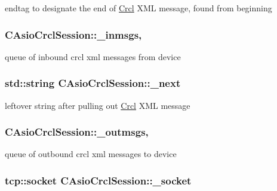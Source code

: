 endtag to designate the end of \hyperlink{namespaceCrcl}{Crcl} X\-M\-L message, found from beginning \hypertarget{classCAsioCrclSession_a35d708bc55a91795905e27ee3c69c3ec}{
\subsubsection[{\-\_\-inmsgs}]{ C\-Asio\-Crcl\-Session\-::\-\_\-inmsgs\hspace{0.3cm}{\ttfamily [static]}, {\ttfamily [protected]}}}\label{classCAsioCrclSession_a35d708bc55a91795905e27ee3c69c3ec}
queue of inbound crcl xml messages from device \hypertarget{classCAsioCrclSession_a332547f983c0b36b09933d9255dac802}{
\subsubsection[{\-\_\-next}]{\setlength{\rightskip}{0pt plus 5cm}std\-::string C\-Asio\-Crcl\-Session\-::\-\_\-next\hspace{0.3cm}{\ttfamily [protected]}}}\label{classCAsioCrclSession_a332547f983c0b36b09933d9255dac802}
leftover string after pulling out \hyperlink{namespaceCrcl}{Crcl} X\-M\-L message \hypertarget{classCAsioCrclSession_a450b2bbbfaf1376f80e68fe3d43507fc}{
\subsubsection[{\-\_\-outmsgs}]{ C\-Asio\-Crcl\-Session\-::\-\_\-outmsgs\hspace{0.3cm}{\ttfamily [static]}, {\ttfamily [protected]}}}\label{classCAsioCrclSession_a450b2bbbfaf1376f80e68fe3d43507fc}
queue of outbound crcl xml messages to device \hypertarget{classCAsioCrclSession_ab92574f487782a95cb9eb745fd1de536}{
\subsubsection[{\-\_\-socket}]{\setlength{\rightskip}{0pt plus 5cm}tcp\-::socket C\-Asio\-Crcl\-Session\-::\-\_\-socket\hspace{0.3cm}{\ttfamily [protected]}}}\label{classCAsioCrclSession_ab92574f487782a95cb9eb745fd1de536}
